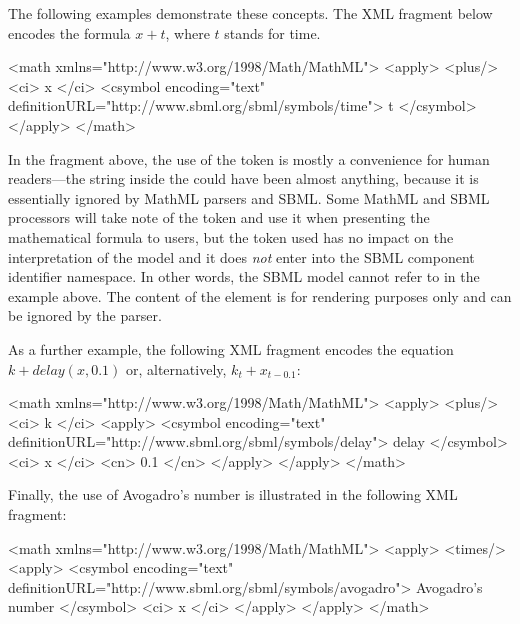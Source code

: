 \begin{itemize}
\end{itemize}

The following examples demonstrate these concepts.  The XML fragment below
encodes the formula $x + t$, where $t$ stands for time.

\begin{example}
<math xmlns="http://www.w3.org/1998/Math/MathML">
    <apply>
        <plus/>
        <ci> x </ci>
        <csymbol encoding="text" definitionURL="http://www.sbml.org/sbml/symbols/time">
            t
        </csymbol>
    </apply>
</math>
\end{example}

In the fragment above, the use of the token  is mostly a
convenience for human readers---the string inside the
 could have been almost anything, because it is
essentially ignored by MathML parsers and SBML.  Some MathML and
SBML processors will take note of the token and use it when
presenting the mathematical formula to users, but the token used
has no impact on the interpretation of the model and it does
\emph{not} enter into the SBML component identifier namespace.  In
other words, the SBML model cannot refer to  in the
example above.  The content of the  element is for
rendering purposes only and can be ignored by the parser.

As a further example, the following XML fragment encodes the equation
$k + delay(x, 0.1)$ or, alternatively, $k_t + x_{t - 0.1}$:

\begin{example}
<math xmlns="http://www.w3.org/1998/Math/MathML">
    <apply>
        <plus/>
        <ci> k </ci>
        <apply>
            <csymbol encoding="text" definitionURL="http://www.sbml.org/sbml/symbols/delay">
                delay
            </csymbol>
            <ci> x </ci>
            <cn> 0.1 </cn>
        </apply>
    </apply>
</math>
\end{example}

Finally, the use of Avogadro's number is illustrated in the
following XML fragment:

\begin{example}
<math xmlns="http://www.w3.org/1998/Math/MathML">
    <apply>
        <times/>
        <apply>
            <csymbol encoding="text" definitionURL="http://www.sbml.org/sbml/symbols/avogadro">
                Avogadro's number
            </csymbol>
            <ci> x </ci>
        </apply>
    </apply>
</math>
\end{example}


